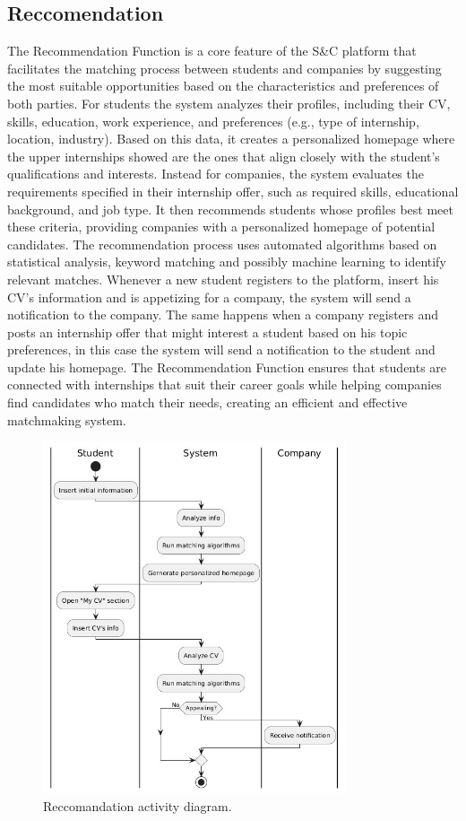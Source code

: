 \subsection{Reccomendation}
The Recommendation Function is a core feature of the S\&C platform that facilitates the matching process between students and companies by suggesting the most suitable opportunities based on the characteristics and preferences of both parties. 
For students the system analyzes their profiles, including their CV, skills, education, work experience, and preferences (e.g., type of internship, location, industry). Based on this data, it creates a personalized homepage where the upper internships showed are the ones that align closely with the student's qualifications and interests.
Instead for companies, the system evaluates the requirements specified in their internship offer, such as required skills, educational background, and job type. It then recommends students whose profiles best meet these criteria, providing companies with a personalized homepage of potential candidates.
The recommendation process uses automated algorithms based on statistical analysis, keyword matching and possibly machine learning to identify relevant matches. Whenever a new student registers to the platform, insert his CV's information and is appetizing for a company, the system will send a notification to the company. The same happens when a company registers and posts an internship offer that might interest a student based on his topic preferences, in this case the system will send a notification to the student and update his homepage. The Recommendation Function ensures that students are connected with internships that suit their career goals while helping companies find candidates who match their needs, creating an efficient and effective matchmaking system.
\begin{figure}[H]
        \centering
        \includegraphics[width=0.8\textwidth]{RASD/Assets/ActivityDiagram/Reccomandation_AD.png}
        \caption{Reccomandation activity diagram.}
        \label{fig:Reccomandation activity diagram.}
    \end{figure}
